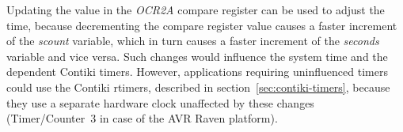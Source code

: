 Updating the value in the {\it{OCR2A}} compare register
can be used to adjust the time, because decrementing the compare register
value causes a faster increment of the {\it{scount}} variable, which in turn causes
a faster increment of the {\it{seconds}} variable and vice versa.
Such changes would influence the system time and the dependent Contiki timers.
However, applications requiring uninfluenced timers
could use the Contiki rtimers, described in section~\ref{sec:contiki-timers},
because they use a separate hardware clock unaffected by these changes
(Timer/Counter~3 in case of the AVR Raven platform).
